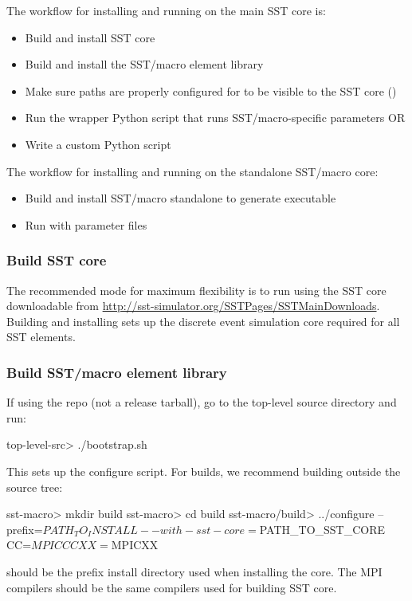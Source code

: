 The workflow for installing and running on the main SST core is:
\begin{itemize}
\item	Build and install SST core
\item Build and install the SST/macro element library  
\item Make sure paths are properly configured for  to be visible to the SST core ()
\item Run the  wrapper Python script that runs SST/macro-specific parameters OR
\item Write a custom Python script 
\end{itemize}

The workflow for installing and running on the standalone SST/macro core:
\begin{itemize}
\item Build and install SST/macro standalone to generate  executable
\item Run  with  parameter files
\end{itemize}

\subsubsection{Build SST core}\label{subsec:buildSSTCore}
The recommended mode for maximum flexibility is to run using the SST core downloadable from \url{http://sst-simulator.org/SSTPages/SSTMainDownloads}.
Building and installing sets up the discrete event simulation core required for all SST elements.

\subsubsection{Build SST/macro element library}\label{subsec:buildElementLib}
If using the repo (not a release tarball), go to the top-level source directory and run:
\begin{ShellCmd}
top-level-src> ./bootstrap.sh
\end{ShellCmd}
This sets up the configure script. For builds, we recommend building outside the source tree:

\begin{ShellCmd}
sst-macro> mkdir build
sst-macro> cd build
sst-macro/build> ../configure --prefix=$PATH_TO_INSTALL --with-sst-core=$PATH_TO_SST_CORE CC=$MPICC CXX=$MPICXX
\end{ShellCmd}
 should be the prefix install directory used when installing the core.  
The MPI compilers should be the same compilers used for building SST core.


